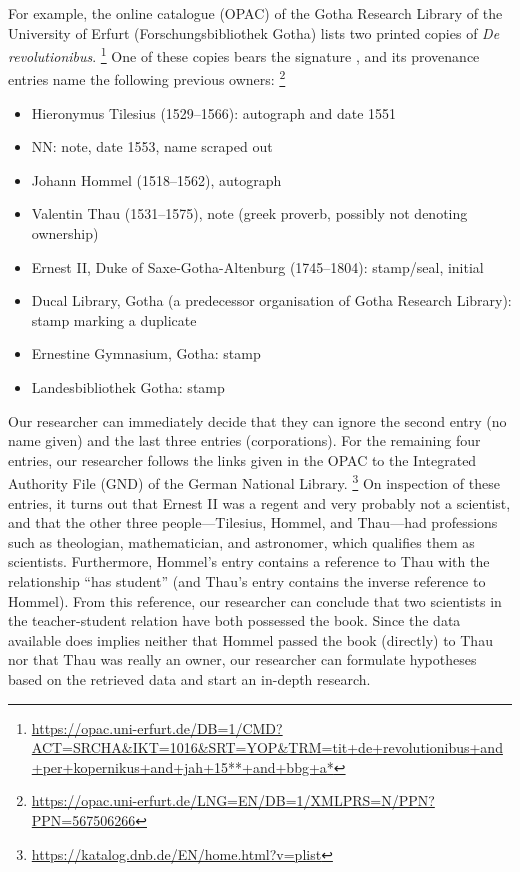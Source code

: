 For example, the online catalogue (OPAC) of the Gotha Research Library of the University of Erfurt (Forschungsbibliothek Gotha) lists two printed copies
of \emph{De revolutionibus}.%
\footnote{%
  \url{https://opac.uni-erfurt.de/DB=1/CMD?ACT=SRCHA&IKT=1016&SRT=YOP&TRM=tit+de+revolutionibus+and+per+kopernikus+and+jah+15**+and+bbg+a*}%
}
One of these copies bears the signature , and its provenance entries name the following previous owners:%
\footnote{%
  \url{https://opac.uni-erfurt.de/LNG=EN/DB=1/XMLPRS=N/PPN?PPN=567506266}%
}
%
\begin{itemize}
  \item
    Hieronymus Tilesius (1529–1566): autograph and date 1551
  \item
    NN: note, date 1553, name scraped out
  \item
    Johann Hommel (1518–1562), autograph
  \item
    Valentin Thau (1531–1575), note (greek proverb, possibly not denoting ownership)
  \item
    Ernest II, Duke of Saxe-Gotha-Altenburg (1745–1804): stamp/seal, initial
  \item
    Ducal Library, Gotha (a predecessor organisation of Gotha Research Library): stamp marking a duplicate
  \item
    Ernestine Gymnasium, Gotha: stamp
  \item
    Landesbibliothek Gotha: stamp
\end{itemize}
%
Our researcher can immediately decide that they can ignore the second entry (no name given) and the last three entries (corporations).
For the remaining four entries, our researcher follows the links given in the OPAC to the Integrated Authority File (GND) of the German National Library.%
\footnote{%
  \url{https://katalog.dnb.de/EN/home.html?v=plist}%
}
On inspection of these entries, it turns out that Ernest II was a regent and very probably not a scientist,
and that the other three people---Tilesius, Hommel, and Thau---had professions such as theologian,
mathematician, and astronomer, which qualifies them as scientists. Furthermore, Hommel's entry
contains a reference to Thau with the relationship \enquote{has student}
(and Thau's entry contains the inverse reference to Hommel).
From this reference, our researcher can conclude that two scientists in the teacher-student relation
have both possessed the book. Since the data available does implies neither that Hommel passed the book (directly) to Thau
nor that Thau was really an owner,
our researcher can formulate hypotheses based on the retrieved data and start an in-depth research.

